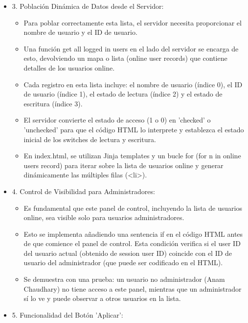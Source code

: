 \documentclass{report}
\begin{document}
\begin{itemize}
\begin{itemize}
\begin{itemize}
            \end{itemize}
    \end{itemize}
    \item 3. Población Dinámica de Datos desde el Servidor:
    \begin{itemize}
        \item Para poblar correctamente esta lista, el servidor necesita proporcionar el nombre de usuario y el ID de usuario.
        \item Una función get all logged in users en el lado del servidor se encarga de esto, devolviendo un mapa o lista (online user records) 
        que contiene detalles de los usuarios online.
        \item Cada registro en esta lista incluye: el nombre de usuario (índice 0), el ID de usuario (índice 1), el estado de lectura (índice 2) 
        y el estado de escritura (índice 3).
        \item El servidor convierte el estado de acceso (1 o 0) en 'checked' o 'unchecked' para que el código HTML lo interprete y establezca 
        el estado inicial de los switches de lectura y escritura.
        \item En index.html, se utilizan Jinja templates y un bucle for (for n in online users record) para iterar sobre la lista de usuarios 
        online y generar dinámicamente las múltiples filas (<li>).
    \end{itemize}
    \item 4. Control de Visibilidad para Administradores:
    \begin{itemize}
        \item Es fundamental que este panel de control, incluyendo la lista de usuarios online, sea visible solo para usuarios administradores.
        \item Esto se implementa añadiendo una sentencia if en el código HTML antes de que comience el panel de control. Esta condición verifica si 
        el user ID del usuario actual (obtenido de session user ID) coincide con el ID de usuario del administrador (que puede ser codificado en el HTML).
        \item Se demuestra con una prueba: un usuario no administrador (Anam Chaudhary) no tiene acceso a este panel, mientras que un administrador 
        sí lo ve y puede observar a otros usuarios en la lista.
    \end{itemize}
    \item 5. Funcionalidad del Botón 'Aplicar':
    \begin{itemize}

\end{itemize}
\end{itemize}
\end{document}

